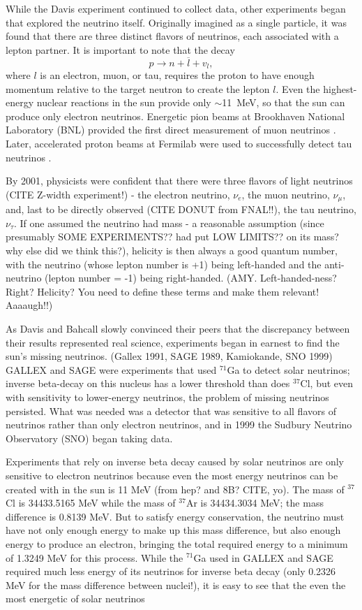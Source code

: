 While the Davis experiment continued to collect data, other experiments began that explored the neutrino itself.  Originally imagined as a single particle, it was found that there are three distinct flavors of neutrinos, each associated with a lepton partner.  It is important to note that the decay 
\begin{equation}
p \rightarrow n + \overline{l} + v_l,
\end{equation}
where $l$ is an electron, muon, or tau, requires the proton to have enough momentum relative to the target neutron to create the lepton $l$.  Even the highest-energy nuclear reactions in the sun provide only $\sim$11~MeV, so that the sun can produce only electron neutrinos.  Energetic pion beams at Brookhaven National Laboratory (BNL) provided the first direct measurement of muon neutrinos \cite{muonNeutrino}.  Later, accelerated proton beams at Fermilab were used to successfully detect tau neutrinos \cite{tauNeutrino}.

By 2001, physicists were confident that there were three flavors of light neutrinos (CITE Z-width experiment!) - the electron neutrino, $\nu_e$, the muon neutrino, $\nu_{\mu}$, and, last to be directly observed (CITE DONUT from FNAL!!), the tau neutrino, $\nu_{\tau}$.  If one assumed the neutrino had mass - a reasonable assumption (since presumably SOME EXPERIMENTS?? had put LOW LIMITS?? on its mass?  why else did we think this?), helicity is then always a good quantum number, with the neutrino (whose lepton number is +1) being left-handed and the anti-neutrino (lepton number = -1) being right-handed.  (AMY.  Left-handed-ness?  Right?  Helicity?  You need to define these terms and make them relevant!  Aaaaugh!!)

As Davis and Bahcall slowly convinced their peers that the discrepancy between their results represented real science, experiments began in earnest to find the sun's missing neutrinos.  (Gallex 1991, SAGE 1989, Kamiokande, SNO 1999)  GALLEX and SAGE were experiments that used $^{71}$Ga to detect solar neutrinos; inverse beta-decay on this nucleus has a lower threshold than does $^{37}$Cl, but even with sensitivity to lower-energy neutrinos, the problem of missing neutrinos persisted.  What was needed was a detector that was sensitive to all flavors of neutrinos rather than only electron neutrinos, and in 1999 the Sudbury Neutrino Observatory (SNO) began taking data.

Experiments that rely on inverse beta decay caused by solar neutrinos are only sensitive to electron neutrinos because even the most energy neutrinos can be created with in the sun is 11 MeV (from hep? and 8B? CITE, yo).  The mass of $^{37}$Cl is 34433.5165 MeV while the mass of $^{37}$Ar is 34434.3034 MeV; the mass difference is 0.8139 MeV.  But to satisfy energy conservation, the neutrino must have not only enough energy to make up this mass difference, but also enough energy to produce an electron, bringing the total required energy to a minimum of 1.3249 MeV for this process.  While the $^{71}$Ga used in GALLEX and SAGE required much less energy of its neutrinos for inverse beta decay (only 0.2326 MeV for the mass difference between nuclei!), it is easy to see that the even the most energetic of solar neutrinos  


